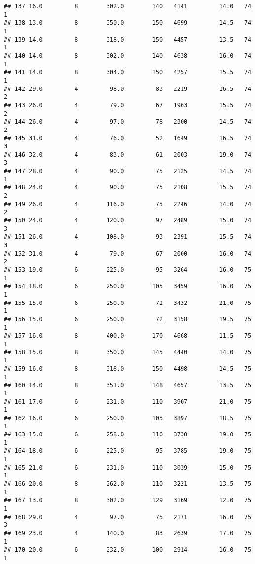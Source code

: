 \documentclass[
]{article}
\begin{document}
\begin{verbatim}
## 137 16.0         8        302.0        140   4141         14.0   74      1
## 138 13.0         8        350.0        150   4699         14.5   74      1
## 139 14.0         8        318.0        150   4457         13.5   74      1
## 140 14.0         8        302.0        140   4638         16.0   74      1
## 141 14.0         8        304.0        150   4257         15.5   74      1
## 142 29.0         4         98.0         83   2219         16.5   74      2
## 143 26.0         4         79.0         67   1963         15.5   74      2
## 144 26.0         4         97.0         78   2300         14.5   74      2
## 145 31.0         4         76.0         52   1649         16.5   74      3
## 146 32.0         4         83.0         61   2003         19.0   74      3
## 147 28.0         4         90.0         75   2125         14.5   74      1
## 148 24.0         4         90.0         75   2108         15.5   74      2
## 149 26.0         4        116.0         75   2246         14.0   74      2
## 150 24.0         4        120.0         97   2489         15.0   74      3
## 151 26.0         4        108.0         93   2391         15.5   74      3
## 152 31.0         4         79.0         67   2000         16.0   74      2
## 153 19.0         6        225.0         95   3264         16.0   75      1
## 154 18.0         6        250.0        105   3459         16.0   75      1
## 155 15.0         6        250.0         72   3432         21.0   75      1
## 156 15.0         6        250.0         72   3158         19.5   75      1
## 157 16.0         8        400.0        170   4668         11.5   75      1
## 158 15.0         8        350.0        145   4440         14.0   75      1
## 159 16.0         8        318.0        150   4498         14.5   75      1
## 160 14.0         8        351.0        148   4657         13.5   75      1
## 161 17.0         6        231.0        110   3907         21.0   75      1
## 162 16.0         6        250.0        105   3897         18.5   75      1
## 163 15.0         6        258.0        110   3730         19.0   75      1
## 164 18.0         6        225.0         95   3785         19.0   75      1
## 165 21.0         6        231.0        110   3039         15.0   75      1
## 166 20.0         8        262.0        110   3221         13.5   75      1
## 167 13.0         8        302.0        129   3169         12.0   75      1
## 168 29.0         4         97.0         75   2171         16.0   75      3
## 169 23.0         4        140.0         83   2639         17.0   75      1
## 170 20.0         6        232.0        100   2914         16.0   75      1

\end{verbatim}
\end{document}
